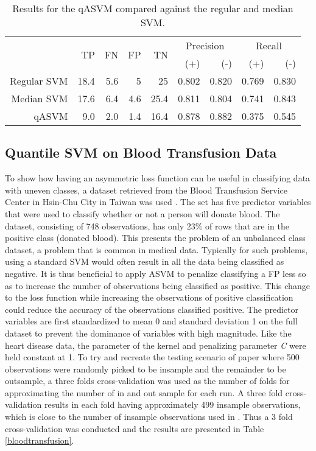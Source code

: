 \documentclass[twoside,11pt]{article}
\begin{document}
\begin{table}[htbp]\label{table:HeartDisease3}
  \centering
    \begin{tabular}{rrrrrrrrr}
    \hline
       & \multirow{2}{*}{TP}    & \multirow{2}{*}{FN}    & \multirow{2}{*}{FP}    & \multirow{2}{*}{TN} & \multicolumn{2}{c}{Precision} & \multicolumn{2}{c}{Recall}\\
&&&&&  (+) &  (-) &  (+) &  (-) \bigstrut\\
    \hline
    \hline
   Regular SVM & 18.4  & 5.6   & 5     & 25    & 0.802 & 0.820 & 0.769 & 0.830 \bigstrut[t]\\
Median SVM & 17.6  & 6.4   & 4.6   & 25.4  & 0.811 & 0.804 & 0.741 & 0.843 \\
qASVM & 9.0   & 2.0   & 1.4   & 16.4  & 0.878 & 0.882 & 0.375 & 0.545 \bigstrut[b]\\
    \hline
    \hline
    \end{tabular}%
    \caption{Results for the qASVM compared against the regular and median SVM.}
\end{table}%


\subsection{Quantile SVM on Blood Transfusion Data}
To show how having an asymmetric loss function can be useful in classifying data with uneven classes, a dataset retrieved from the Blood Transfusion Service Center in Hsin-Chu City in Taiwan was used \citep{Yeh09}. The set has five predictor variables that were used to classify whether or not a person will donate blood. The dataset, consisting of 748 observations, has only 23\% of rows that are in the positive class (donated blood). This presents the problem of an unbalanced class dataset, a problem that is common in medical data. Typically for such problems, using a standard SVM would often result in all the data being classified as negative. It is thus beneficial to apply ASVM to penalize classifying a FP less so as to increase the number of observations being classified as positive. This change to the loss function while increasing the observations of positive classification could reduce the accuracy of the observations classified positive. The predictor variables are first standardized to mean 0 and standard deviation 1 on the full dataset to prevent the dominance of variables with high magnitude. Like the heart disease data, the parameter of the kernel and penalizing parameter \emph{C} were held constant at 1. To try and recreate the testing scenario of \citet{Yeh09} paper where 500 observations were randomly picked to be insample and the remainder to be outsample, a three folds cross-validation was used as the number of folds for approximating the number of in and out sample for each run. A three fold cross-validation results in each fold having approximately 499 insample observations, which is close to the number of insample observations used in \citet{Yeh09}. Thus a 3 fold cross-validation was conducted and the results are presented in Table \ref{bloodtransfusion}.
\end{document}
